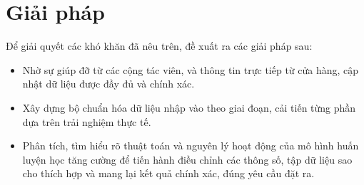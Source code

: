 \section{Giải pháp}
Để giải quyết các khó khăn đã nêu trên, đề xuất ra các giải pháp sau:

\begin{itemize}
    \item Nhờ sự giúp đỡ từ các cộng tác viên, và thông tin trực tiếp từ cửa hàng, cập nhật dữ liệu được đầy đủ và chính xác.
    \item Xây dựng bộ chuẩn hóa dữ liệu nhập vào theo giai đoạn, cải tiến từng phần dựa trên trải nghiệm thực tế.
    \item Phân tích, tìm hiểu rõ thuật toán và nguyên lý hoạt động của mô hình huấn luyện học tăng cường để tiến hành điều chỉnh các thông số, tập dữ liệu sao cho thích hợp và mang lại kết quả chính xác, đúng yêu cầu đặt ra.
\end{itemize}
